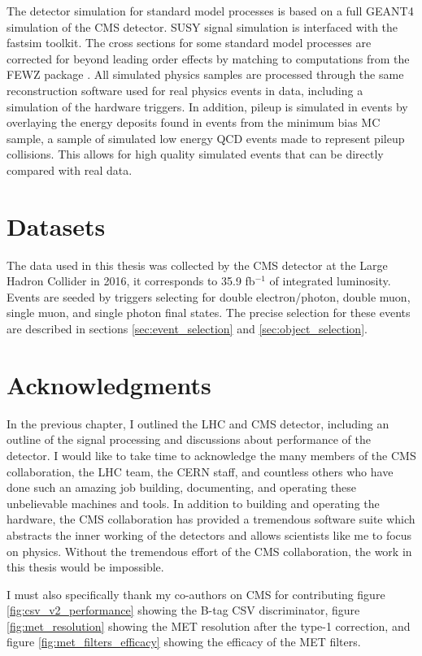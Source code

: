   The detector simulation for standard model processes is based on a full GEANT4 \cite{GEANT} simulation of the CMS detector. SUSY signal simulation is interfaced with the fastsim toolkit. \cite{fastsim} The cross sections for some standard model processes are corrected for beyond leading order effects by matching to computations from the FEWZ package \cite{FEWZ}. All simulated physics samples are processed through the same reconstruction software used for real physics events in data, including a simulation of the hardware triggers. In addition, pileup is simulated in events by overlaying the energy deposits found in events from the minimum bias MC sample, a sample of simulated low energy QCD events made to represent pileup collisions. This allows for high quality simulated events that can be directly compared with real data.

\section{Datasets} \label{sec:datasets}
  The data used in this thesis was collected by the CMS detector at the Large Hadron Collider in 2016, it corresponds to 35.9 fb$^{-1}$ of integrated luminosity. Events are seeded by triggers selecting for double electron/photon, double muon, single muon, and single photon final states. The precise selection for these events are described in sections \ref{sec:event_selection} and \ref{sec:object_selection}.

\section{Acknowledgments}

  In the previous chapter, I outlined the LHC and CMS detector, including an outline of the signal processing and discussions about performance of the detector. I would like to take time to acknowledge the many members of the CMS collaboration, the LHC team, the CERN staff, and countless others who have done such an amazing job building, documenting, and operating these unbelievable machines and tools. In addition to building and operating the hardware, the CMS collaboration has provided a tremendous software suite which abstracts the inner working of the detectors and allows scientists like me to focus on physics. Without the tremendous effort of the CMS collaboration, the work in this thesis would be impossible.

  
  I must also specifically thank my co-authors on CMS for contributing figure \ref{fig:csv_v2_performance} showing the B-tag CSV discriminator, figure \ref{fig:met_resolution} showing the MET resolution after the type-1 correction, and figure \ref{fig:met_filters_efficacy} showing the efficacy of the MET filters.